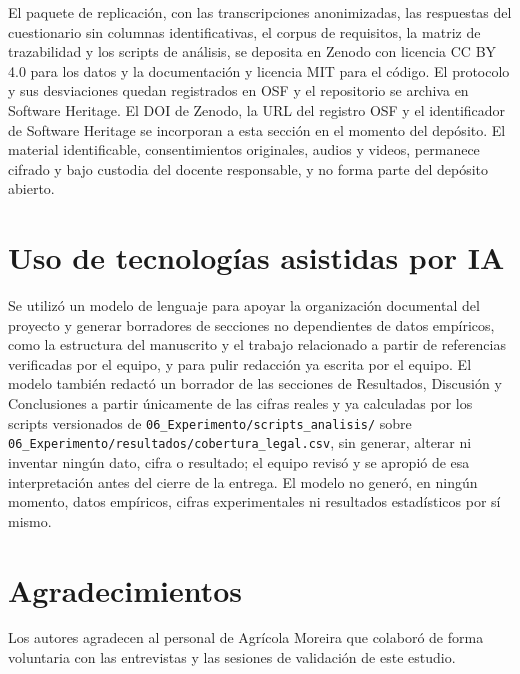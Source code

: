 \documentclass[pdflatex,sn-mathphys-num]{sn-jnl}
\begin{document}
El paquete de replicaci\'on, con las transcripciones anonimizadas, las respuestas del cuestionario sin columnas identificativas, el corpus de requisitos, la matriz de trazabilidad y los scripts de an\'alisis, se deposita en Zenodo con licencia CC BY 4.0 para los datos y la documentaci\'on y licencia MIT para el c\'odigo. El protocolo y sus desviaciones quedan registrados en OSF y el repositorio se archiva en Software Heritage. El DOI de Zenodo, la URL del registro OSF y el identificador de Software Heritage se incorporan a esta secci\'on en el momento del dep\'osito. El material identificable, consentimientos originales, audios y videos, permanece cifrado y bajo custodia del docente responsable, y no forma parte del dep\'osito abierto.

\section*{Uso de tecnolog\'ias asistidas por IA}

Se utiliz\'o un modelo de lenguaje para apoyar la organizaci\'on documental del proyecto y generar borradores de secciones no dependientes de datos emp\'iricos, como la estructura del manuscrito y el trabajo relacionado a partir de referencias verificadas por el equipo, y para pulir redacci\'on ya escrita por el equipo. El modelo tambi\'en redact\'o un borrador de las secciones de Resultados, Discusi\'on y Conclusiones a partir \'unicamente de las cifras reales y ya calculadas por los scripts versionados de \texttt{06\_Experimento/scripts\_analisis/} sobre \texttt{06\_Experimento/resultados/cobertura\_legal.csv}, sin generar, alterar ni inventar ning\'un dato, cifra o resultado; el equipo revis\'o y se apropi\'o de esa interpretaci\'on antes del cierre de la entrega. El modelo no gener\'o, en ning\'un momento, datos emp\'iricos, cifras experimentales ni resultados estad\'isticos por s\'i mismo.

\section*{Agradecimientos}

Los autores agradecen al personal de Agr\'icola Moreira que colabor\'o de forma voluntaria con las entrevistas y las sesiones de validaci\'on de este estudio.


\end{document}
